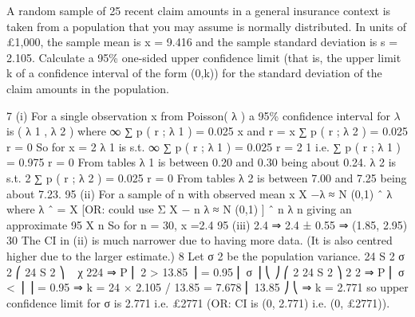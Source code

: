 \documentclass[a4paper,12pt]{article}
\begin{document}
\item 
A random sample of 25 recent claim amounts in a general insurance context is taken from a population that you may assume is normally distributed. In units of £1,000, the sample mean is x = 9.416 and the sample standard deviation is s = 2.105.
Calculate a 95\% one-sided upper confidence limit (that is, the upper limit k of a confidence interval of the form (0,k)) for the standard deviation of the claim amounts in the population.

7
(i)
For a single observation x from Poisson( λ ) a 95\% confidence interval for $\lambda$ is
( λ 1 , λ 2 ) where
∞
∑ p ( r ; λ 1 ) = 0.025
x
and
r = x
∑ p ( r ; λ 2 ) = 0.025
r = 0
So for x = 2
λ 1 is s.t.
∞
∑ p ( r ; λ 1 ) = 0.025
r = 2
1
i.e.
∑ p ( r ; λ 1 ) = 0.975
r = 0
From tables λ 1 is between 0.20 and 0.30 being about 0.24.
λ 2 is s.t.
2
∑ p ( r ; λ 2 ) = 0.025
r = 0
From tables λ 2 is between 7.00 and 7.25 being about 7.23.
95%
(ii)
For a sample of n with observed mean x
X −λ
≈ N (0,1)
ˆ λ
where λ ˆ = X
[OR: could use
Σ X − n λ
≈ N (0,1) ]
ˆ
n λ
n
giving an approximate 95%
X
n
So for n = 30, x =2.4
95%
(iii)
2.4
⇒ 2.4 ± 0.55 ⇒ (1.85, 2.95)
30
The CI in (ii) is much narrower due to having more data.
(It is also centred higher due to the larger estimate.)
8
Let σ 2 be the population variance.
24 S 2
σ 2
⎛ 24 S 2
⎞
~ χ 224 ⇒ P ⎜ 2 > 13.85 ⎟ = 0.95
⎜ σ
⎟
⎝
⎠
⎛ 2 24 S 2 ⎞
2
2
⇒ P ⎜ σ <
⎟ ⎟ = 0.95 ⇒ k = 24 × 2.105 / 13.85 = 7.678
⎜
13.85 ⎠
⎝
⇒ k = 2.771 so upper confidence limit for σ is 2.771 i.e. £2771
(OR: CI is (0, 2.771) i.e. (0, £2771)).
\end{document}
